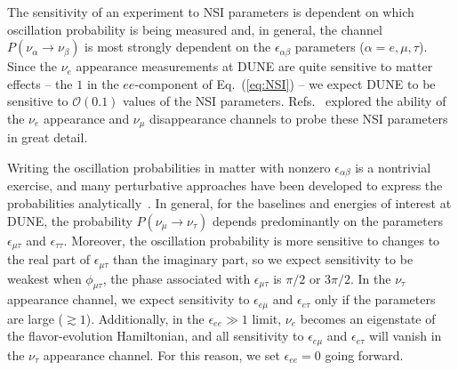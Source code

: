 \documentclass[aps,prd,onecolumn,nofootinbib,superscriptaddress, 11pt]{revtex4}
\begin{document}
The sensitivity of an experiment to NSI parameters is dependent on which oscillation probability is being measured and, in general, the channel $P(\nu_\alpha \to \nu_\beta)$ is most strongly dependent on the $\epsilon_{\alpha\beta}$ parameters ($\alpha=e,\mu,\tau$). Since the $\nu_e$ appearance measurements at DUNE are quite sensitive to matter effects -- the $1$ in the $ee$-component of Eq.~(\ref{eq:NSI}) -- we expect DUNE to be sensitive to $\mathcal{O}(0.1)$ values of the NSI parameters. Refs.~\cite{deGouvea:2015ndi,Coloma:2015kiu} explored the ability of the $\nu_e$ appearance and $\nu_\mu$ disappearance channels to probe these NSI parameters in great detail.

Writing the oscillation probabilities in matter with nonzero $\epsilon_{\alpha\beta}$ is a nontrivial exercise, and many perturbative approaches have been developed to express the probabilities analytically~\cite{Kikuchi:2008vq,Martinez-Soler:2018lcy,Chaves:2018sih}. In general, for the baselines and energies of interest at DUNE, the probability $P(\nu_\mu \to \nu_\tau)$ depends predominantly on the parameters $\epsilon_{\mu\tau}$ and $\epsilon_{\tau\tau}$. Moreover, the oscillation probability is more sensitive to changes to the real part of $\epsilon_{\mu\tau}$ than the imaginary part, so we expect sensitivity to be weakest when $\phi_{\mu\tau}$, the phase associated with $\epsilon_{\mu\tau}$ is $\pi/2$ or $3\pi/2$. In the $\nu_\tau$ appearance channel, we expect sensitivity to $\epsilon_{e\mu}$ and $\epsilon_{e\tau}$ only if the parameters are large ($\gtrsim 1$). Additionally, in the $\epsilon_{ee}\gg 1$ limit, $\nu_e$ becomes an eigenstate of the flavor-evolution Hamiltonian, and all sensitivity to $\epsilon_{e\mu}$ and $\epsilon_{e\tau}$ will vanish in the $\nu_\tau$ appearance channel. For this reason, we set $\epsilon_{ee} = 0$ going forward.
\end{document}
